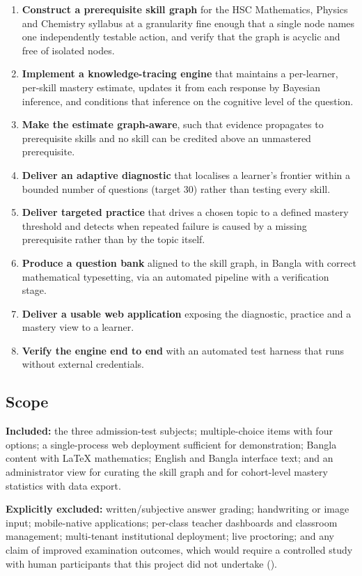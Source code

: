 \begin{enumerate}[label=\textbf{O\arabic*.}, leftmargin=*]
  \item \textbf{Construct a prerequisite skill graph} for the HSC Mathematics,
    Physics and Chemistry syllabus at a granularity fine enough that a single
    node names one independently testable action, and verify that the graph is
    acyclic and free of isolated nodes.
  \item \textbf{Implement a knowledge-tracing engine} that maintains a
    per-learner, per-skill mastery estimate, updates it from each response by
    Bayesian inference, and conditions that inference on the cognitive level of
    the question.
  \item \textbf{Make the estimate graph-aware}, such that evidence propagates to
    prerequisite skills and no skill can be credited above an unmastered
    prerequisite.
  \item \textbf{Deliver an adaptive diagnostic} that localises a learner's
    frontier within a bounded number of questions (target 30) rather than
    testing every skill.
  \item \textbf{Deliver targeted practice} that drives a chosen topic to a
    defined mastery threshold and detects when repeated failure is caused by a
    missing prerequisite rather than by the topic itself.
  \item \textbf{Produce a question bank} aligned to the skill graph, in Bangla
    with correct mathematical typesetting, via an automated pipeline with a
    verification stage.
  \item \textbf{Deliver a usable web application} exposing the diagnostic,
    practice and a mastery view to a learner.
  \item \textbf{Verify the engine end to end} with an automated test harness that
    runs without external credentials.
\end{enumerate}

\subsection{Scope}

\textbf{Included:} the three admission-test subjects; multiple-choice items
with four options; a single-process web deployment sufficient for demonstration;
Bangla content with \LaTeX{} mathematics; English and Bangla interface text; and
an administrator view for curating the skill graph and for cohort-level mastery
statistics with data export.

\textbf{Explicitly excluded:} written/subjective answer grading; handwriting or
image input; mobile-native applications; per-class teacher dashboards and
classroom management; multi-tenant institutional deployment; live proctoring;
and any claim of
improved examination outcomes, which would require a controlled study with human
participants that this project did not undertake ().

